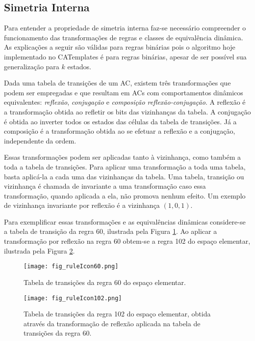 \subsection{Simetria Interna}
Para entender a propriedade de simetria interna faz-se necessário compreender o funcionamento das transformações de regras e classes de equivalência dinâmica. As explicações a seguir são válidas para regras binárias pois o algoritmo hoje implementado no CATemplates é para regras binárias, apesar de ser possível sua generalização para $k$ estados.

Dada uma tabela de transições de um AC, existem três transformações que podem ser empregadas e que resultam em ACs com comportamentos dinâmicos equivalentes: \textit{reflexão}, \textit{conjugação} e \textit{composição reflexão-conjugação}. A reflexão é a transformação obtida ao refletir os bits das vizinhanças da tabela. A conjugação é obtida ao inverter todos os estados das células da tabela de transições. Já a composição é a transformação obtida ao se efetuar a reflexão e a conjugação, independente da ordem.

Essas transformações podem ser aplicadas tanto à vizinhança, como também a toda a tabela de transições. Para aplicar uma transformação a toda uma tabela, basta aplicá-la a cada uma das vizinhanças da tabela. Uma tabela, transição ou vizinhança é chamada de invariante a uma transformação caso essa transformação, quando aplicada a ela, não promova nenhum efeito. Um exemplo de vizinhança invariante por reflexão é a vizinhança $(1,0,1)$.

Para exemplificar essas transformações e as equivalências dinâmicas considere-se a tabela de transição da regra 60, ilustrada pela Figura \ref{fig:table60}. Ao aplicar a transformação por reflexão na regra 60 obtem-se a regra 102 do espaço elementar, ilustrada pela Figura \ref{fig:table102}.

	\begin{figure}[h!]
	  \centering
	  \texttt{[image: fig\_ruleIcon60.png]}
	  \caption{Tabela de transições da regra 60 do espaço elementar.}
	  \label{fig:table60}
	\end{figure}

	\begin{figure}[h!]
	  \centering
	  \texttt{[image: fig\_ruleIcon102.png]}
	  \caption{Tabela de transições da regra 102 do espaço elementar, obtida através da transformação de reflexão aplicada na tabela de transições da regra 60.}
	  \label{fig:table102}
	\end{figure}

